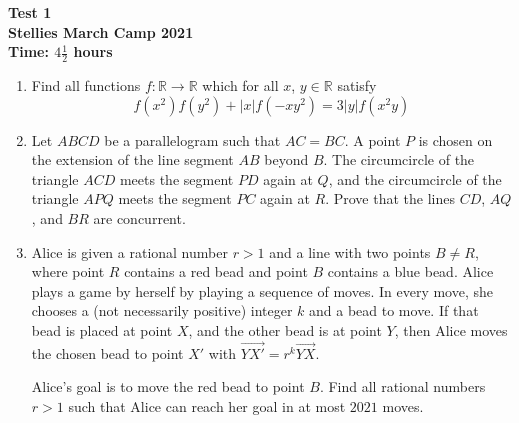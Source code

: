 \documentclass{article}
\begin{document}
\thispagestyle{empty}

\begin{center}
  \textbf{\Large Test 1}
  \\ \vspace{1em}
  \textbf{\large Stellies March Camp 2021}
  \\ \vspace{1em}
  \textbf{\large Time: $4\frac{1}{2}$ hours}
\end{center}

\vspace{24pt}

\begin{enumerate}

\item %
Find all functions $f : \mathbb{R} \to \mathbb{R}$ which for all $x$, $y \in \mathbb{R}$ satisfy
$$f(x^{2})f(y^{2}) + |x|f(-xy^{2}) = 3|y|f(x^{2}y)$$



\item %
Let $ABCD$ be a parallelogram such that $AC = BC$.
A point $P$ is chosen on the extension of the line segment $AB$ beyond $B$.
The circumcircle of the triangle $ACD$ meets the segment $PD$ again at $Q$, and the circumcircle of the triangle $APQ$ meets the segment $PC$ again at $R$.
Prove that the lines $CD$, $AQ$, and $BR$ are concurrent.

\item %
Alice is given a rational number $r > 1$ and a line with two points $B \neq R$, where point $R$ contains a red bead and point $B$ contains a blue bead.
Alice plays a game by herself by playing a sequence of moves.
In every move, she chooses a (not necessarily positive) integer $k$ and a bead to move.
If that bead is placed at point $X$, and the other bead is at point $Y$, then Alice moves the chosen bead to point $X'$ with $\overrightarrow{YX'} = r^k \overrightarrow{YX}$.

Alice's goal is to move the red bead to point $B$.
Find all rational numbers $r > 1$ such that Alice can reach her goal in at most $2021$ moves.

\end{enumerate}

\vfill
\centering
\begin{BVerbatim}
\end{BVerbatim}
\end{document}
